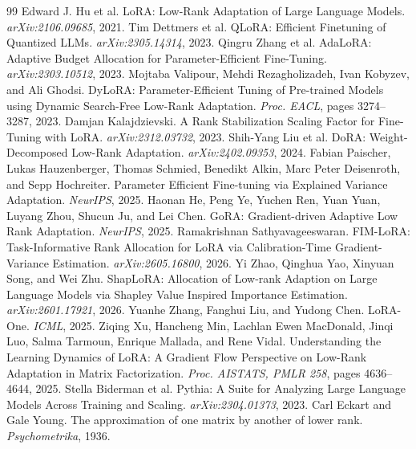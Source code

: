 \documentclass[10pt,twocolumn]{article}
\theoremstyle{definition}
\begin{document}
\begingroup
\footnotesize
\setlength{\itemsep}{0pt}
\setlength{\parskip}{0pt}
\begin{thebibliography}{99}
 Edward J. Hu et al. LoRA: Low-Rank Adaptation of Large Language Models. \emph{arXiv:2106.09685}, 2021.
 Tim Dettmers et al. QLoRA: Efficient Finetuning of Quantized LLMs. \emph{arXiv:2305.14314}, 2023.
 Qingru Zhang et al. AdaLoRA: Adaptive Budget Allocation for Parameter-Efficient Fine-Tuning. \emph{arXiv:2303.10512}, 2023.
 Mojtaba Valipour, Mehdi Rezagholizadeh, Ivan Kobyzev, and Ali Ghodsi. DyLoRA: Parameter-Efficient Tuning of Pre-trained Models using Dynamic Search-Free Low-Rank Adaptation. \emph{Proc. EACL}, pages 3274--3287, 2023.
 Damjan Kalajdzievski. A Rank Stabilization Scaling Factor for Fine-Tuning with LoRA. \emph{arXiv:2312.03732}, 2023.
 Shih-Yang Liu et al. DoRA: Weight-Decomposed Low-Rank Adaptation. \emph{arXiv:2402.09353}, 2024.
 Fabian Paischer, Lukas Hauzenberger, Thomas Schmied, Benedikt Alkin, Marc Peter Deisenroth, and Sepp Hochreiter. Parameter Efficient Fine-tuning via Explained Variance Adaptation. \emph{NeurIPS}, 2025.
 Haonan He, Peng Ye, Yuchen Ren, Yuan Yuan, Luyang Zhou, Shucun Ju, and Lei Chen. GoRA: Gradient-driven Adaptive Low Rank Adaptation. \emph{NeurIPS}, 2025.
 Ramakrishnan Sathyavageeswaran. FIM-LoRA: Task-Informative Rank Allocation for LoRA via Calibration-Time Gradient-Variance Estimation. \emph{arXiv:2605.16800}, 2026.
 Yi Zhao, Qinghua Yao, Xinyuan Song, and Wei Zhu. ShapLoRA: Allocation of Low-rank Adaption on Large Language Models via Shapley Value Inspired Importance Estimation. \emph{arXiv:2601.17921}, 2026.
 Yuanhe Zhang, Fanghui Liu, and Yudong Chen. LoRA-One. \emph{ICML}, 2025.
 Ziqing Xu, Hancheng Min, Lachlan Ewen MacDonald, Jinqi Luo, Salma Tarmoun, Enrique Mallada, and Rene Vidal. Understanding the Learning Dynamics of LoRA: A Gradient Flow Perspective on Low-Rank Adaptation in Matrix Factorization. \emph{Proc. AISTATS, PMLR 258}, pages 4636--4644, 2025.
 Stella Biderman et al. Pythia: A Suite for Analyzing Large Language Models Across Training and Scaling. \emph{arXiv:2304.01373}, 2023.
 Carl Eckart and Gale Young. The approximation of one matrix by another of lower rank. \emph{Psychometrika}, 1936.

\end{thebibliography}
\end{document}
